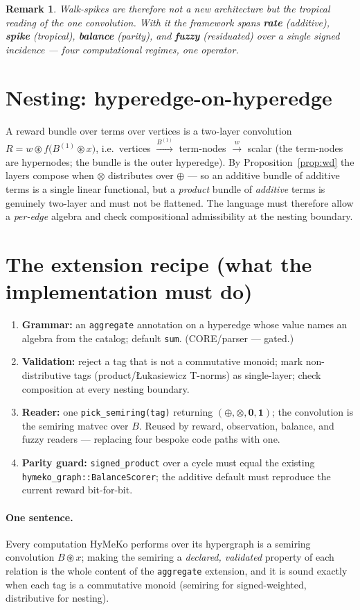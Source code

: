 \documentclass[11pt]{article}
\newtheorem{remark}{Remark}
\begin{document}
\begin{remark}
Walk-spikes are therefore not a new architecture but the \emph{tropical reading} of the one convolution. With it
the framework spans \textbf{rate} (additive), \textbf{spike} (tropical), \textbf{balance} (parity), and
\textbf{fuzzy} (residuated) over a single signed incidence --- four computational regimes, one operator.
\end{remark}

\section{Nesting: hyperedge-on-hyperedge}\label{sec:nest}
A reward bundle over terms over vertices is a two-layer convolution
$R=w\!\circledast f\!\big(B^{(1)}\!\circledast x\big)$, i.e.\ vertices $\xrightarrow{B^{(1)}}$ term-nodes
$\xrightarrow{w}$ scalar (the term-nodes are hypernodes; the bundle is the outer hyperedge). By
Proposition~\ref{prop:wd} the layers compose when $\otimes$ distributes over $\oplus$ --- so an additive bundle of
additive terms is a single linear functional, but a \emph{product} bundle of \emph{additive} terms is genuinely
two-layer and must not be flattened. The language must therefore allow a \emph{per-edge} algebra and check
compositional admissibility at the nesting boundary.

\section{The extension recipe (what the implementation must do)}
\begin{enumerate}[nosep,leftmargin=1.4em]
  \item \textbf{Grammar:} an \texttt{aggregate} annotation on a hyperedge whose value names an algebra from the
        catalog; default \texttt{sum}. (CORE/parser --- gated.)
  \item \textbf{Validation:} reject a tag that is not a commutative monoid; mark non-distributive tags
        (product/\L{}ukasiewicz T-norms) as single-layer; check composition at every nesting boundary.
  \item \textbf{Reader:} one \texttt{pick\_semiring(tag)} returning $(\oplus,\otimes,\mathbf 0,\mathbf 1)$; the
        convolution is the semiring matvec over $B$. Reused by reward, observation, balance, and fuzzy readers ---
        replacing four bespoke code paths with one.
  \item \textbf{Parity guard:} \texttt{signed\_product} over a cycle must equal the existing
        \texttt{hymeko\_graph::BalanceScorer}; the additive default must reproduce the current reward bit-for-bit.
\end{enumerate}

\paragraph{One sentence.} Every computation HyMeKo performs over its hypergraph is a semiring convolution
$B\circledast x$; making the semiring a \emph{declared, validated} property of each relation is the whole content
of the \texttt{aggregate} extension, and it is sound exactly when each tag is a commutative monoid (semiring for
signed-weighted, distributive for nesting).
\end{document}
